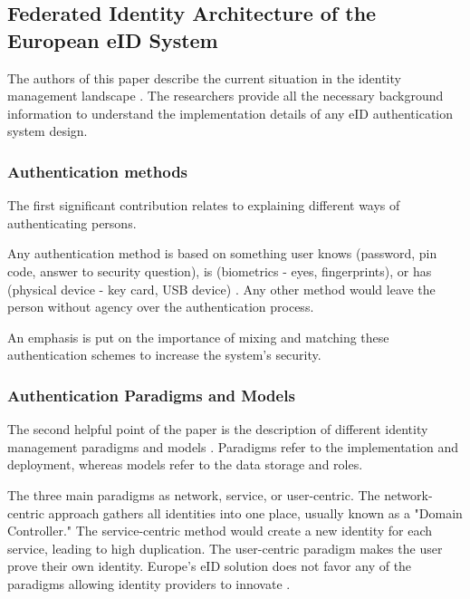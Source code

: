 \subsection{Federated Identity Architecture of the European eID System}

The authors of this paper describe the current situation in the identity management landscape \cite{federated-europe-identity}. The researchers provide all the necessary background information to understand the implementation details of any eID authentication system design.

\subsubsection{Authentication methods}

The first significant contribution relates to explaining different ways of authenticating persons.

Any authentication method is based on something user knows (password, pin code, answer to security question), is (biometrics - eyes, fingerprints), or has (physical device - key card, USB device) \cite{o2003comparing}. Any other method would leave the person without agency over the authentication process.

An emphasis is put on the importance of mixing and matching these authentication schemes to increase the system's security.

\subsubsection{Authentication Paradigms and Models}

The second helpful point of the paper is the description of different identity management paradigms and models \cite{identity-paradigms}. Paradigms refer to the implementation and deployment, whereas models refer to the data storage and roles.

The three main paradigms as network, service, or user-centric. The network-centric approach gathers all identities into one place, usually known as a "Domain Controller." The service-centric method would create a new identity for each service, leading to high duplication. The user-centric paradigm makes the user prove their own identity. Europe's eID solution does not favor any of the paradigms allowing identity providers to innovate \cite{eelaw-idcard,eeid,dokobit}.

